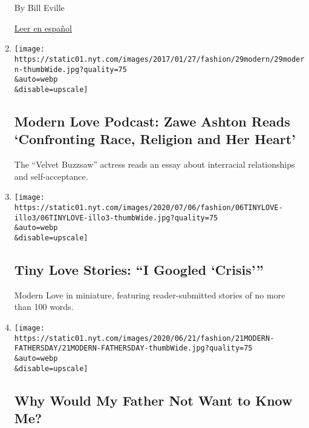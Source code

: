 \begin{enumerate}
  By Bill Eville

  \href{https://www.nytimes.com/es/2020/07/05/espanol/estilos-de-vida/cancer-cabello.html}{Leer
  en español}
\item
  \href{/2020/06/24/style/modern-love-podcast-zawe-ashton.html}{}

  \texttt{[image: https://static01.nyt.com/images/2017/01/27/fashion/29modern/29modern-thumbWide.jpg?quality=75\\\&auto=webp\\\&disable=upscale]}

  \hypertarget{modern-love-podcast-zawe-ashton-reads-confronting-race-religion-and-her-heart}{%
  \subsection{Modern Love Podcast: Zawe Ashton Reads `Confronting Race,
  Religion and Her
  Heart'}\label{modern-love-podcast-zawe-ashton-reads-confronting-race-religion-and-her-heart}}

  The ``Velvet Buzzsaw'' actress reads an essay about interracial
  relationships and self-acceptance.
\item
  \href{/2020/06/23/style/tiny-modern-love-stories-coronavirus-i-googled-crisis.html}{}

  \texttt{[image: https://static01.nyt.com/images/2020/07/06/fashion/06TINYLOVE-illo3/06TINYLOVE-illo3-thumbWide.jpg?quality=75\\\&auto=webp\\\&disable=upscale]}

  \hypertarget{tiny-love-stories-i-googled-crisis}{%
  \subsection{Tiny Love Stories: ``I Googled
  `Crisis'''}\label{tiny-love-stories-i-googled-crisis}}

  Modern Love in miniature, featuring reader-submitted stories of no
  more than 100 words.
\item
  \href{/2020/06/19/style/modern-love-coronavirus-missing-father.html}{}

  \texttt{[image: https://static01.nyt.com/images/2020/06/21/fashion/21MODERN-FATHERSDAY/21MODERN-FATHERSDAY-thumbWide.jpg?quality=75\\\&auto=webp\\\&disable=upscale]}

  \hypertarget{why-would-my-father-not-want-to-know-me}{%
  \subsection{Why Would My Father Not Want to Know
  Me?}\label{why-would-my-father-not-want-to-know-me}}


\end{enumerate}
